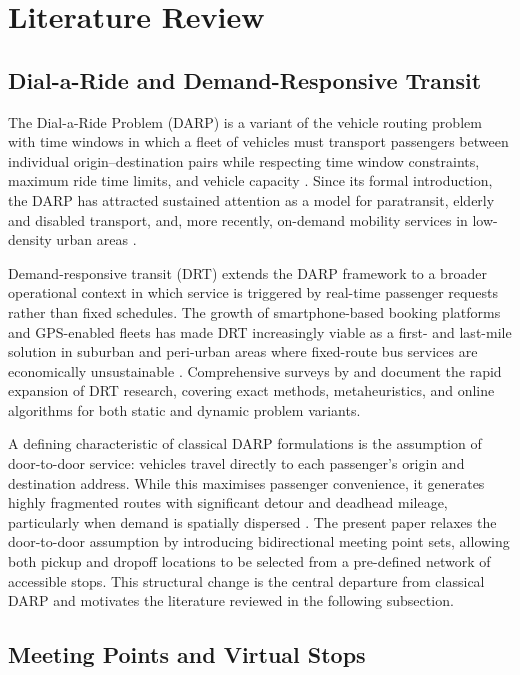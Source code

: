 \section{Literature Review}
\label{sec:literature}

\subsection{Dial-a-Ride and Demand-Responsive Transit}

The Dial-a-Ride Problem (DARP) is a variant of the vehicle routing problem with time windows in which a fleet of vehicles must transport passengers between individual origin--destination pairs while respecting time window constraints, maximum ride time limits, and vehicle capacity \citep{cordeau2007}. Since its formal introduction, the DARP has attracted sustained attention as a model for paratransit, elderly and disabled transport, and, more recently, on-demand mobility services in low-density urban areas \citep{psaraftis1988, parragh2008a}.

Demand-responsive transit (DRT) extends the DARP framework to a broader operational context in which service is triggered by real-time passenger requests rather than fixed schedules. The growth of smartphone-based booking platforms and GPS-enabled fleets has made DRT increasingly viable as a first- and last-mile solution in suburban and peri-urban areas where fixed-route bus services are economically unsustainable \citep{molenbruch2017}. Comprehensive surveys by \citet{ho2018} and \citet{pillac2013} document the rapid expansion of DRT research, covering exact methods, metaheuristics, and online algorithms for both static and dynamic problem variants.

A defining characteristic of classical DARP formulations is the assumption of door-to-door service: vehicles travel directly to each passenger's origin and destination address. While this maximises passenger convenience, it generates highly fragmented routes with significant detour and deadhead mileage, particularly when demand is spatially dispersed \citep{agatz2012}. The present paper relaxes the door-to-door assumption by introducing bidirectional meeting point sets, allowing both pickup and dropoff locations to be selected from a pre-defined network of accessible stops. This structural change is the central departure from classical DARP and motivates the literature reviewed in the following subsection.

\subsection{Meeting Points and Virtual Stops}


